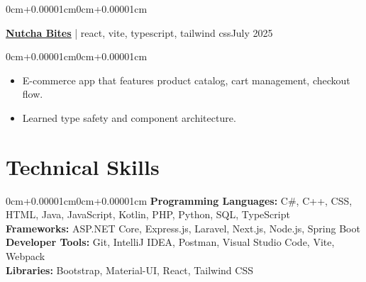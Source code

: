 \documentclass[10pt, letterpaper]{article}
\newenvironment{highlights}{\begin{itemize}[topsep=0.10cm,parsep=0.10cm,partopsep=0pt,itemsep=0pt,leftmargin=0cm+10pt]}{\end{itemize}}
\newenvironment{onecolentry}{\begin{adjustwidth}{0cm+0.00001cm}{0cm+0.00001cm}}{\end{adjustwidth}}
\newenvironment{twocolentry}[2][]{\onecolentry\def\secondColumn{#2}\setcolumnwidth{\fill,5cm}\begin{paracol}{2}}{\switchcolumn \raggedleft \secondColumn\end{paracol}\endonecolentry}
\begin{document}
    \vspace{0.15cm}
    \begin{twocolentry}{July 2025}
        \textbf{\underline{\href{https://nutcha-bites.vercel.app/}{Nutcha Bites}}} | react, vite, typescript, tailwind css\end{twocolentry}
    \vspace{0.10cm}
    \begin{onecolentry}
        \begin{highlights}
            \item E-commerce app that features product catalog, cart management, checkout flow.
            \item Learned type safety and component architecture.
        \end{highlights}
    \end{onecolentry}
    \vspace{0.15cm}

\section{Technical Skills}
\begin{onecolentry}
    \textbf{Programming Languages:} C\#, C++, CSS, HTML, Java, JavaScript, Kotlin, PHP, Python, SQL, TypeScript \\
    \vspace{0.10cm}
    \textbf{Frameworks:} ASP.NET Core, Express.js, Laravel, Next.js, Node.js, Spring Boot \\
    \vspace{0.10cm}
    \textbf{Developer Tools:} Git, IntelliJ IDEA, Postman, Visual Studio Code, Vite, Webpack \\
    \vspace{0.10cm}
    \textbf{Libraries:} Bootstrap, Material-UI, React, Tailwind CSS \\
    \vspace{0.10cm}

\end{onecolentry}
\end{document}
